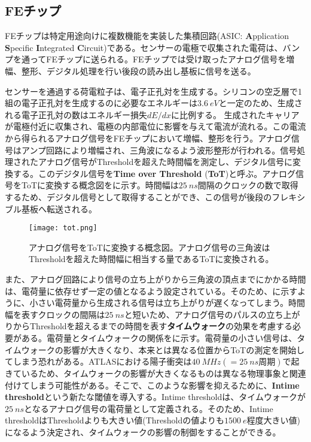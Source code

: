 \subsection{FEチップ}
\label{sec:ASIC}

FEチップは特定用途向けに複数機能を実装した集積回路(ASIC: \textbf{A}pplication \textbf{S}pecific \textbf{I}ntegrated \textbf{C}ircuit)である。センサーの電極で収集された電荷は、バンプを通ってFEチップに送られる。FEチップでは受け取ったアナログ信号を増幅、整形、デジタル処理を行い後段の読み出し基板に信号を送る。

センサーを通過する荷電粒子は、電子正孔対を生成する。シリコンの空乏層で1組の電子正孔対を生成するのに必要なエネルギーは$3.6\ \si{eV}$と一定のため、生成される電子正孔対の数はエネルギー損失$dE/dx$に比例する。
生成されたキャリアが電極付近に収集され、電極の内部電位に影響を与えて電流が流れる。この電流から得られるアナログ信号をFEチップにおいて増幅、整形を行う。アナログ信号はアンプ回路により増幅され、三角波になるよう波形整形が行われる。信号処理されたアナログ信号がThresholdを超えた時間幅を測定し、デジタル信号に変換する。このデジタル信号を\textbf{Time over Threshold} (\textbf{ToT})と呼ぶ。アナログ信号をToTに変換する概念図をに示す。時間幅は$25\ \si{ns}$間隔のクロックの数で取得するため、デジタル信号として取得することができ、この信号が後段のフレキシブル基板へ転送される。

\begin{figure}[tbp]
  \centering
  \texttt{[image: tot.png]}
  \caption[アナログ信号をToTに変換する概念図]{アナログ信号をToTに変換する概念図。アナログ信号の三角波はThresholdを超えた時間幅に相当する量であるToTに変換される。}
  \label{fig:tot}
\end{figure}

また、アナログ回路により信号の立ち上がりから三角波の頂点までにかかる時間は、電荷量に依存せず一定の値となるよう設定されている。そのため、に示すように、小さい電荷量から生成される信号は立ち上がりが遅くなってしまう。時間幅を表すクロックの間隔は$25\ \si{ns}$と短いため、アナログ信号のパルスの立ち上がりからThresholdを超えるまでの時間を表す\textbf{タイムウォーク}の効果を考慮する必要がある。電荷量とタイムウォークの関係をに示す。電荷量の小さい信号は、タイムウォークの影響が大きくなり、本来とは異なる位置からToTの測定を開始してしまう恐れがある。ATLASにおける陽子衝突は$40\ \si{MHz}(=25\ \si{ns}\mathrm{周期})$で起きているため、タイムウォークの影響が大きくなるものは異なる物理事象と関連付けてしまう可能性がある。そこで、このような影響を抑えるために、\textbf{Intime threshold}という新たな閾値を導入する。Intime thresholdは、タイムウォークが$25\ \si{ns}$となるアナログ信号の電荷量として定義される。そのため、Intime thresholdはThresholdよりも大きい値(Thresholdの値よりも$1500\ \si{e}$程度大きい値)になるよう決定され、タイムウォークの影響の制御をすることができる。

